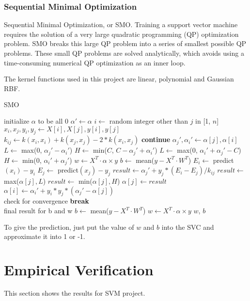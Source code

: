 \documentclass[journal,twoside,web]{ieeecolor}
\begin{document}
\subsubsection{Sequential Minimal Optimization}
Sequential Minimal Optimization, or SMO. Training a support vector machine requires the solution of a very large quadratic programming (QP) optimization problem. SMO breaks this large QP problem into a series of smallest possible QP problems. These small QP problems are solved analytically, which avoids using a time-consuming numerical QP optimization as an inner loop. \cite{smo} \par
The kernel functions used in this project are linear, polynomial and Gaussian RBF. 
\begin{algorithm}
\caption{SMO}
\begin{algorithmic} [1]
\STATE initialize $\alpha$ to be all 0
\STATE $\alpha'\gets \alpha$
\STATE $i \gets$ random integer other than $j$ in [1, $n$]
\STATE $x_i, x_j, y_i, y_j \gets X[i], X[j], y[i], y[j]$
\STATE $k_{ij} \gets k(x_i, x_i) + k(x_j, x_j) - 2 * k(x_i, x_j)$
\STATE \textbf{continue}
\ENDIF
\STATE $\alpha_j', \alpha_i' \gets \alpha[j], \alpha[i]$
\STATE $L\gets$  max(0, $\alpha_j' - \alpha_i'$)
\STATE $H\gets$  min($C$, $C - \alpha_j' + \alpha_i'$)
\ELSE
\STATE $L\gets$  max(0, $\alpha_i' + \alpha_j' -C$)
\STATE $H\gets$  min(0, $\alpha_i' + \alpha_j'$)
\ENDIF
\STATE $w\gets X^T \cdot \alpha \times y$
\STATE $b\gets$  mean($y - X^T \cdot W^T$)
\STATE $E_i \gets $ predict$(x_i) - y_i$
\STATE $E_j \gets $ predict$(x_j) - y_j$
\STATE $result \gets \alpha_j' + y_j * (E_i - E_j) / k_{ij}$
\STATE $result \gets$ max($\alpha[j], L$)
\STATE $result \gets$ min($\alpha[j], H$)
\STATE $\alpha[j] \gets result$
\STATE $\alpha[i] \gets \alpha_i' + y_i * y_j * (\alpha_j' - \alpha[j])$
\ENDFOR  
\\ check for convergence
\STATE \textbf{break}
\ENDIF
\\ final result for b and w
\STATE $b\gets$  mean($y - X^T \cdot W^T$)
\STATE $w\gets X^T \cdot \alpha \times y$
\ENDIF
\ENDWHILE
\RETURN $w$, $b$
\end{algorithmic}
\end{algorithm}

To give the prediction, just put the value of $w$ and $b$ into the SVC and approximate it into 1 or -1.

\section{Empirical Verification}
This section shows the results for SVM project.
\end{document}
